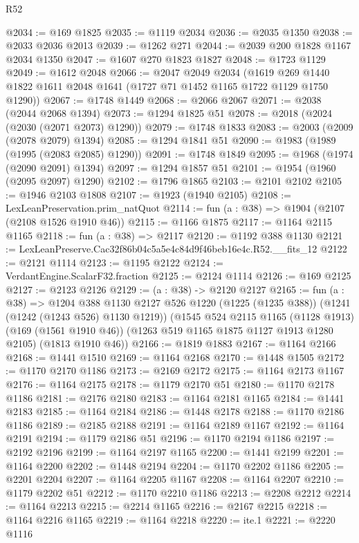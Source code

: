 \begin{lexlean}{R52}
\begin{coremodule}
@2034 := @169 @1825
@2035 := @1119 @2034
@2036 := @2035 @1350
@2038 := @2033 @2036 @2013
@2039 := @1262 @271
@2044 := @2039 @200 @1828 @1167 @2034 @1350
@2047 := @1607 @270 @1823 @1827
@2048 := @1723 @1129
@2049 := @1612 @2048
@2066 := @2047
    @2049
    @2034
    (@1619 @269 @1440 @1822 @1611 @2048 @1641 (@1727 @71 @1452 @1165 @1722 @1129 @1750 @1290))
@2067 := @1748 @1449
@2068 := @2066 @2067
@2071 := @2038 (@2044 @2068 @1394)
@2073 := @1294 @1825 @51
@2078 := @2018 (@2024 (@2030 (@2071 @2073) @1290))
@2079 := @1748 @1833
@2083 := @2003 (@2009 (@2078 @2079) @1394)
@2085 := @1294 @1841 @51
@2090 := @1983 (@1989 (@1995 (@2083 @2085) @1290))
@2091 := @1748 @1849
@2095 := @1968 (@1974 (@2090 @2091) @1394)
@2097 := @1294 @1857 @51
@2101 := @1954 (@1960 (@2095 @2097) @1290)
@2102 := @1796 @1865
@2103 := @2101 @2102
@2105 := @1946 @2103 @1808
@2107 := @1923 (@1940 @2105)
@2108 := LexLeanPreservation.prim_natQuot
@2114 := fun (a : @38) => @1904 (@2107 (@2108 @1526 @1910 @46))
@2115 := @1166 @1875
@2117 := @1164 @2115 @1165
@2118 := fun (a : @38) => @2117
@2120 := @1192 @388 @1130
@2121 := LexLeanPreserve.Cac32f86b04c5a5e4c84d9f46beb16e4c.R52.__fits_12
@2122 := @2121 @1114
@2123 := @1195 @2122
@2124 := VerdantEngine.ScalarF32.fraction
@2125 := @2124 @1114
@2126 := @169 @2125
@2127 := @2123 @2126
@2129 := (a : @38) -> @2120 @2127
@2165 := fun (a : @38) =>
  @1204
    @388
    @1130
    @2127
    @526
    @1220
    (@1225 (@1235 @388))
    (@1241 (@1242 (@1243 @526) @1130 @1219))
    (@1545
      @524
      @2115
      @1165
      (@1128 @1913)
      (@169 (@1561 @1910 @46))
      (@1263 @519 @1165 @1875 @1127 @1913 @1280 @2105)
      (@1813 @1910 @46))
@2166 := @1819 @1883
@2167 := @1164 @2166
@2168 := @1441 @1510
@2169 := @1164 @2168
@2170 := @1448 @1505
@2172 := @1170 @2170 @1186
@2173 := @2169 @2172
@2175 := @1164 @2173 @1167
@2176 := @1164 @2175
@2178 := @1179 @2170 @51
@2180 := @1170 @2178 @1186
@2181 := @2176 @2180
@2183 := @1164 @2181 @1165
@2184 := @1441 @2183
@2185 := @1164 @2184
@2186 := @1448 @2178
@2188 := @1170 @2186 @1186
@2189 := @2185 @2188
@2191 := @1164 @2189 @1167
@2192 := @1164 @2191
@2194 := @1179 @2186 @51
@2196 := @1170 @2194 @1186
@2197 := @2192 @2196
@2199 := @1164 @2197 @1165
@2200 := @1441 @2199
@2201 := @1164 @2200
@2202 := @1448 @2194
@2204 := @1170 @2202 @1186
@2205 := @2201 @2204
@2207 := @1164 @2205 @1167
@2208 := @1164 @2207
@2210 := @1179 @2202 @51
@2212 := @1170 @2210 @1186
@2213 := @2208 @2212
@2214 := @1164 @2213
@2215 := @2214 @1165
@2216 := @2167 @2215
@2218 := @1164 @2216 @1165
@2219 := @1164 @2218
@2220 := ite.{1}
@2221 := @2220 @1116

\end{coremodule}
\end{lexlean}
